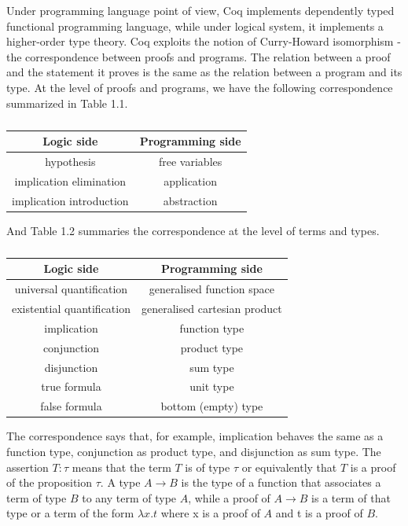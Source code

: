 Under programming language point of view, Coq implements dependently
typed functional programming language, while under logical system, it
implements a higher-order type theory. Coq exploits the notion of
Curry-Howard isomorphism - the correspondence between proofs and
programs. The relation between a proof and the statement it proves is
the same as the relation between a program and its type. At the level
of proofs and programs, we have the following correspondence
summarized in Table 1.1.
\begin{table}[h!]
\begin{center}
	\begin{tabular}{|c|c|}
		\hline
		Logic side & Programming side \\ \hline  \hline
		hypothesis & free variables \\ \hline
		implication elimination & application \\ \hline
		implication introduction & abstraction \\ \hline
	\end{tabular}
\end{center}
\caption{}
\end{table}

And Table 1.2 summaries the correspondence at the level of terms and types.
\begin{table}[h!]
\begin{center}
	\begin{tabular}{|c|c|}
		\hline
			Logic side & Programming side \\ \hline 
			universal quantification & generalised function space \\ \hline
			existential quantification & generalised cartesian product \\ \hline
			implication	& function type \\ \hline
			conjunction	& product type \\ \hline
			disjunction	& sum type \\ \hline
			true formula & unit type \\ \hline
			false formula & bottom (empty) type \\ \hline
	\end{tabular}
\end{center}
\caption{}
\end{table}
The correspondence says that, for example, implication behaves the same as a
function type, conjunction as product type, and disjunction as sum
type. %
The assertion $T:\tau$ means that the term $T$ is of type $\tau$ or
equivalently that $T$ is a proof of the proposition $\tau$.   A type $A \rightarrow B$
is the type of a function that associates  a term of type $B$ to any
term of type $A$, while a proof of $A \rightarrow B$ is a term of that
type or a term of the form $\lambda x.t$ where x is a proof of $A$ and
t is a proof of $B$. 

